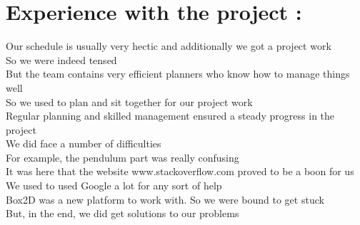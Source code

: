 \documentclass{article}
\begin{document}
\section{Experience with the project : }
\hspace*{5 mm}Our schedule is usually very hectic and additionally we got a project work \\
\hspace*{5 mm}So we were indeed tensed \\
\hspace*{5 mm}But the team contains very efficient planners who know how to manage things well \\
\hspace*{5 mm}So we used to plan and sit together for our project work \\
\hspace*{5 mm}Regular planning and skilled management ensured a steady progress in the project \\
\hspace*{5 mm}We did face a number of difficulties \\
\hspace*{5 mm}For example, the pendulum part was really confusing \\
\hspace*{5 mm}It was here that the website www.stackoverflow.com proved to be a boon for us \\
\hspace*{5 mm}We used to used Google a lot for any sort of help \\
\hspace*{5 mm}Box2D was a new platform to work with. So we were bound to get stuck \\
\hspace*{5 mm}But, in the end, we did get solutions to our problems \\
\end{document}
